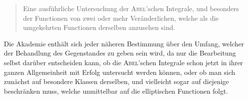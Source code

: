 \documentclass[11pt]{article}
\newcommand{\scn}[1]{\textsc{#1}}
\begin{document}
\begin{quote}
Eine ausführliche Untersuchung der \scn{Abel}'schen Integrale, und besonders der Functionen von zwei oder mehr Veränderlichen, welche als die umgekehrten Functionen derselben anzusehen sind.
\end{quote}

Die Akademie enthält sich jeder näheren Bestimmung über den Umfang, welcher der Behandlung des Gegenstandes zu geben sein wird, da nur die Bearbeitung selbst darüber entscheiden kann, ob die \scn{Abel}'schen Integrale schon jetzt in ihrer ganzen Allgemeinheit mit Erfolg untersucht werden können, oder ob man sich zunächst auf besondere Klassen derselben, und vielleicht sogar auf diejenige beschränken muss, welche unmittelbar auf die elliptischen Functionen folgt.
\end{document}
